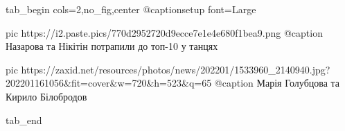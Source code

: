  
 
 
 
 

\ifcmt
  tab_begin cols=2,no_fig,center
		 @captionsetup font=Large

     pic https://i2.paste.pics/770d2952720d9ecce7e1e4e680f1bea9.png
		 @caption Назарова та Нікітін потрапили до топ-10 у танцях

		 pic https://zaxid.net/resources/photos/news/202201/1533960_2140940.jpg?202201161056&fit=cover&w=720&h=523&q=65
		 @caption Марія Голубцова та Кирило Білобродов

  tab_end
\fi
